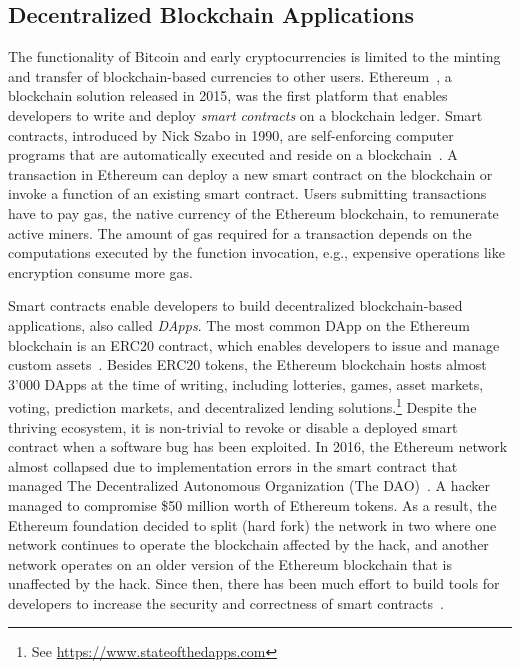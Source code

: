 \subsection{Decentralized Blockchain Applications}
The functionality of Bitcoin and early cryptocurrencies is limited to the minting and transfer of blockchain-based currencies to other users.
Ethereum~\cite{wood2014ethereum}, a blockchain solution released in 2015, was the first platform that enables developers to write and deploy \emph{smart contracts} on a blockchain ledger.
Smart contracts, introduced by Nick Szabo in 1990, are self-enforcing computer programs that are automatically executed and reside on a blockchain~\cite{szabo1996smart}.
A transaction in Ethereum can deploy a new smart contract on the blockchain or invoke a function of an existing smart contract.
Users submitting transactions have to pay gas, the native currency of the Ethereum blockchain, to remunerate active miners.
The amount of gas required for a transaction depends on the computations executed by the function invocation, e.g., expensive operations like encryption consume more gas.


Smart contracts enable developers to build decentralized blockchain-based applications, also called \emph{DApps}.
The most common DApp on the Ethereum blockchain is an ERC20 contract, which enables developers to issue and manage custom assets~\cite{victor2019measuring}.
Besides ERC20 tokens, the Ethereum blockchain hosts almost 3'000 DApps at the time of writing, including lotteries, games, asset markets, voting, prediction markets, and decentralized lending solutions.\footnote{See \url{https://www.stateofthedapps.com}}
Despite the thriving ecosystem, it is non-trivial to revoke or disable a deployed smart contract when a software bug has been exploited.
In 2016, the Ethereum network almost collapsed due to implementation errors in the smart contract that managed The Decentralized Autonomous Organization (The DAO)~\cite{mehar2019understanding}.
A hacker managed to compromise \$50 million worth of Ethereum tokens.
As a result, the Ethereum foundation decided to split (hard fork) the network in two where one network continues to operate the blockchain affected by the hack, and another network operates on an older version of the Ethereum blockchain that is unaffected by the hack.
Since then, there has been much effort to build tools for developers to increase the security and correctness of smart contracts~\cite{breidenbach2018enter,brent2020ethainter}.

